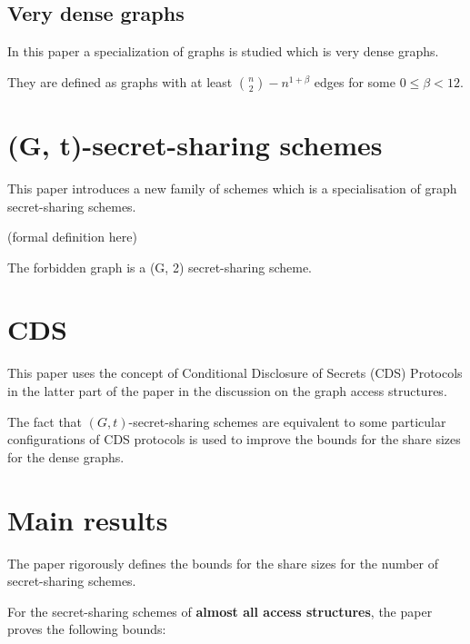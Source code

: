\subsection{Very dense graphs}

In this paper a specialization of graphs is studied which is very dense graphs.

They are defined as graphs with at least $\binom{n}{2} - n^{1 + \beta }$ edges for some $0 \le \beta < 12$.

\section{(G, t)-secret-sharing schemes}

This paper introduces a new family of schemes which is a specialisation of graph secret-sharing schemes.

(formal definition here)

The forbidden graph is a (G, 2) secret-sharing scheme.

\section{CDS}

This paper uses the concept of Conditional Disclosure of Secrets (CDS) Protocols in the latter part of the paper in the discussion on the graph access structures.

The fact that $(G,t)$-secret-sharing schemes are equivalent to some particular configurations of CDS protocols is used to improve the bounds for the share sizes for the dense graphs.

\section{Main results}

The paper rigorously defines the bounds for the share sizes for the number of secret-sharing schemes.

For the secret-sharing schemes of \textbf{almost all access structures}, the paper proves the following bounds:

